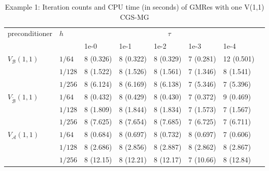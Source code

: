 \documentclass[smallcondensed]{svjour3}
\numberwithin{equation}{section} \numberwithin{table}{section}
\numberwithin{figure}{section}
\numberwithin{algorithm}{section}
\begin{document}
\begin{table}
\caption{Example 1: Iteration counts and CPU time (in seconds) of GMRes with one V(1,1) CGS-MG} 
\begin{center}
\begin{tabularx}{\linewidth}{m{25mm} *7{X}}
\hline
\multirow{2}{*}{preconditioner} & \multirow{2}{*}{$h$} &\multicolumn{5}{c}{$\tau$} \\
                          \cline{3-7}
                                        &   &1e-0&1e-1&1e-2&1e-3&1e-4\\ 
\hline
\multirow{3}{*}{$V_{\mathcal{B}}(1,1)$} & {$1/64$}  &  8 (0.326) &    8 (0.322)  &   8 (0.329)  &   7 (0.281) &   12 (0.501)\\
         					&{$1/128$} &  8 (1.522)  &   8 (1.526)  &    8 (1.561)   &   7 (1.346)   &   8 (1.541)\\
             					& {$1/256$}  & 8 (6.124)  &   8 (6.169)   &   8 (6.138)    &   7 (5.346)   &   7 (5.396)\\
\hline
\multirow{3}{*}{$V_{\tilde{\mathcal{B}}}(1,1)$} & {$1/64$}& 8 (0.432) &    8 (0.429)  &   8 (0.430)  &   7 (0.372) &   9 (0.469)\\						        &{$1/128$} & 8 (1.809)  &   8 (1.844)  &  8 (1.834)   &   7 (1.573)   &   7 (1.567)\\
						&{$1/256$} & 8 (7.625)  &   8 (7.654)   &   8 (7.685)    &   7 (6.725)   &   7 (6.711)\\
\hline						
\multirow{3}{*}{$V_{\mathcal{A}}(1,1)$} & {$1/64$}& 8 (0.684) & 8 (0.697) &8 (0.732) &8 (0.697) &7 (0.606)\\									&{$1/128$} &  8 (2.686) &    8 (2.856)  &    8 (2.887)   &   8 (2.862)   &   8 (2.867)\\
						&{$1/256$} & 8 (12.15)  & 8 (12.21) &   8 (12.17)&  7 (10.66)	&  8 (12.84)\\	
\hline
\end{tabularx}
\end{center}
\label{GMRes-MG-Vanka-ex1}
\end{table}
\end{document}
